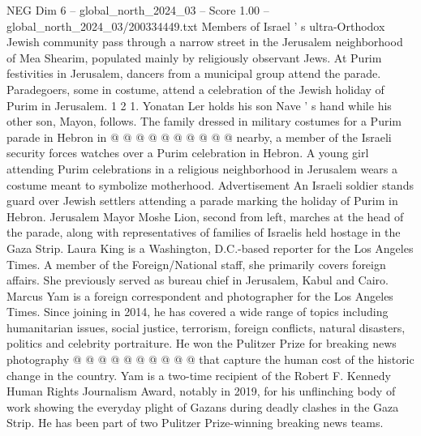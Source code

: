 \begin{textsample}{NEG Dim 6 – global\_north\_2024\_03 – Score 1.00 – global\_north\_2024\_03/200334449.txt}
Members of Israel ' s ultra-Orthodox Jewish community pass through a narrow street in the Jerusalem neighborhood of Mea Shearim, populated mainly by religiously observant Jews.
At Purim festivities in Jerusalem, dancers from a municipal group attend the parade.
Paradegoers, some in costume, attend a celebration of the Jewish holiday of Purim in Jerusalem. 1 2 1.
Yonatan Ler holds his son Nave ' s hand while his other son, Mayon, follows.
The family dressed in military costumes for a Purim parade in Hebron in @ @ @ @ @ @ @ @ @ @ nearby, a member of the Israeli security forces watches over a Purim celebration in Hebron.
A young girl attending Purim celebrations in a religious neighborhood in Jerusalem wears a costume meant to symbolize motherhood.
Advertisement An Israeli soldier stands guard over Jewish settlers attending a parade marking the holiday of Purim in Hebron.
Jerusalem Mayor Moshe Lion, second from left, marches at the head of the parade, along with representatives of families of Israelis held hostage in the Gaza Strip.
Laura King is a Washington, D.C.-based reporter for the Los Angeles Times.
A member of the Foreign/National staff, she primarily covers foreign affairs.
She previously served as bureau chief in Jerusalem, Kabul and Cairo.
Marcus Yam is a foreign correspondent and photographer for the Los Angeles Times.
Since joining in 2014, he has covered a wide range of topics including humanitarian issues, social justice, terrorism, foreign conflicts, natural disasters, politics and celebrity portraiture.
He won the Pulitzer Prize for breaking news photography @ @ @ @ @ @ @ @ @ @ that capture the human cost of the historic change in the country.
Yam is a two-time recipient of the Robert F.
Kennedy Human Rights Journalism Award, notably in 2019, for his unflinching body of work showing the everyday plight of Gazans during deadly clashes in the Gaza Strip.
He has been part of two Pulitzer Prize-winning breaking news teams.

\end{textsample}

